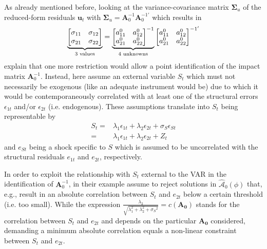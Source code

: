\documentclass[a4paper,11pt,listof=nochaptergap,oneside,pointednumbers,bibtotoc,bigheadings,liststotoc,hidelinks]{scrbook}
\theoremstyle{mysatz}
\theoremstyle{mydefinition}
\theoremstyle{mytheorem}
\theoremstyle{mybemerkung}
\let\oldhat\hat
\newcommand{\vect}[1]{\boldsymbol{\mathbf{#1}}}
\newcommand{\hatt}[1]{\oldhat{\boldsymbol{\mathbf{#1}}}}
\begin{document}
As already mentioned before, looking at the variance-covariance matrix $\vect{\Sigma}_u$ of the reduced-form residuals $\vect{u}_t$ with $\vect{\Sigma}_u = \vect{A}_{0}^{-1} \vect{A}_{0}^{-1'}$ which results in 
$$		
		\underbrace{%
		\begin{bmatrix}
    		\sigma_{11} & \sigma_{12} \\
		\sigma_{21} & \sigma_{22}
 		\end{bmatrix}
}_{\text{3 values}} = \underbrace{%
		\begin{bmatrix}
    		a_{11}^0 & a_{12}^0 \\
		a_{21}^0 & a_{22}^0
 		\end{bmatrix}^{-1}
}_{\text{4 unknowns}}
\begin{bmatrix}
    		a_{11}^0 & a_{12}^0  \\
		a_{21}^0 & a_{22}^0
 		\end{bmatrix}^{{-1}'}$$
\citet{ludvigsonetal:17} explain that one more restriction would allow a point identification of the impact matrix $ \vect{A}_{0}^{-1}$. Instead, here \citet{ludvigsonetal:17} assume an external variable $S_t$ which must not necessarily be exogenous (like an adequate instrument would be) due to which it would be contemporaneously correlated with at least one of the structural errors $\epsilon_{1t}$ and/or $\epsilon_{2t}$ (i.e. endogenous). These assumptions translate into $S_t$ being representable by 
	\begin{equation} \label{eq:svar_ludvig1}
		\begin{split}
	S_t =&  \lambda_1 \epsilon_{1t} + \lambda_2 \epsilon_{2t} + \sigma_S \epsilon_{St} \\
	     = & 	\lambda_1 \epsilon_{1t} + \lambda_2 \epsilon_{2t} + Z_t		
	     	\end{split}				
	\end{equation}	
and $e_{St}$ being a shock specific to $S$ which is assumed to be uncorrelated with the structural residuals $e_{1t}$ and $e_{2t}$, respectively. 

In order to exploit the relationship with $S_t$ external to the VAR in the identification of $ \vect{A}_{0}^{-1}$, in their example \citet{ludvigsonetal:17} assume to reject solutions in $\hatt{\mathcal{A}}_0(\phi)$ that, e.g., result in an absolute correlation between $S_t$ and $e_{2t}$ below a certain threshold (i.e. too small). While the expression $\frac{\lambda_2}{\sqrt{\lambda_{1}^2 + \lambda_{2}^2 + \sigma_S{^2}}} = c(\vect{A_0})$ stands for the correlation between $S_t$ and $e_{2t}$ and depends on the particular $\vect{A_0}$ considered, demanding a minimum absolute correlation equals a non-linear constraint between $S_t$ and $e_{2t}$.\\
\end{document}
